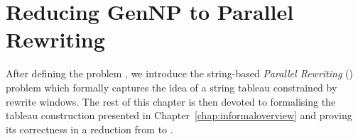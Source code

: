 \newcommand{\winw}[2]{\textsf{window}_{#1}{(#2)}}
\newcommand{\win}[1]{\textsf{window}{(#1)}}
\newcommand{\str}[1]{\textsf{string}{(#1)}}
\newcommand{\prem}[1]{\textsf{prem}~#1}
\newcommand{\conc}[1]{\textsf{conc}~#1}
\newcommand{\rewHead}[3]{\textsf{rewHead}~#1~#2~#3}
\newcommand{\rewAt}[4]{\textsf{rewAt}~#1~#2~#3~#4}
\newcommand{\prefix}[2]{\textsf{prefix}~#1~#2}

\newcommand{\strentE}[1]{\rightsquigarrow_{#1}^E}
\renewcommand{\strent}[1]{\rightsquigarrow_{#1}}

\newcommand{\pFlip}[1]{\textsf{pFlip}~#1}
\newcommand{\pFlipi}[1]{\text{\textasciitilde}#1}
\newcommand{\pRev}{\textsf{pRev}}

\newcommand{\nilstr}[2]{E~#1~#2}

\newcommand{\divides}{\mid}
\newcommand{\notdivides}{\nmid}

\newcommand{\Rtape}{\ensuremath{R_{\text{tape}}}}
\newcommand{\Rtrans}{\ensuremath{R_{\text{trans}}}}
\newcommand{\Rhalt}{\ensuremath{R_{\text{halt}}}}
\newcommand{\Rsim}{\ensuremath{R_{\text{sim}}}}

\newcommand{\isSpecStateSym}[2]{\textsf{stateSym}~#1~#2}
\newcommand{\haltString}[1]{\textsf{haltingString}~#1}
\newcommand{\validCert}[1]{\textsf{validCert}~#1}
\newcommand{\validInput}[1]{\textbf{REPLACE ME}}

\newcommand{\stringForTapeHalf}{\textsf{stringForTapeHalf}}
\newcommand{\stringForConfig}{\textsf{stringForConfig}}

\newcommand{\trewwin}[6]{
  \tikzexternaldisable
  \begin{tikzpicture}
    \draw[thick] (0, 0) -- (2.25, 0);
    \draw (0.75, -0.75) -- (0.75, 0.75);
    \draw (1.5, -0.75) -- (1.5, 0.75);
    \node at (0.375, 0.375) {\ensuremath{#1}};
    \node at (0.375, -0.375) {\ensuremath{#4}};
    \node at (1.125, 0.375) {\ensuremath{#2}};
    \node at (1.125, -0.375) {\ensuremath{#5}};
    \node at (1.875, 0.375) {\ensuremath{#3}};
    \node at (1.875, -0.375) {\ensuremath{#6}};
  \end{tikzpicture}
  \tikzexternalenable
}

\newcommand*{\irewwin}[6]{\ensuremath{[#1, #2, #3]~/~[#4, #5, #6]}}
\chapter{Reducing GenNP to Parallel Rewriting}\label{chap:gennp_pr}
After defining the problem \gennp{}, 
we introduce the string-based \emph{Parallel Rewriting} (\PR{}) problem which formally captures the idea of a string tableau constrained by rewrite windows. The rest of this chapter is then devoted to formalising the tableau construction presented in Chapter~\ref{chap:informaloverview} and proving its correctness in a reduction from \gennp{} to \PR{}.

